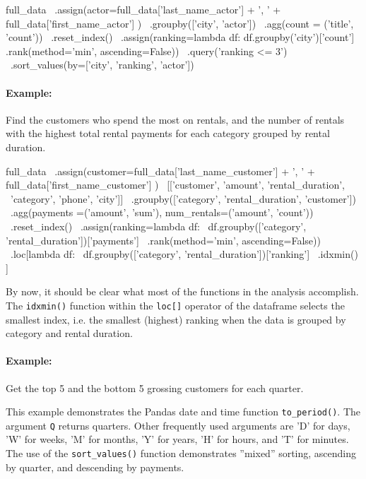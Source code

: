 \begin{samepage}
\begin{pythoncode}
full_data \
   .assign(actor=full_data['last_name_actor'] + ', ' + 
                 full_data['first_name_actor'] ) \
   .groupby(['city', 'actor']) \
   .agg(count = ('title', 'count')) \
   .reset_index() \
   .assign(ranking=lambda df: 
      df.groupby('city')['count']
        .rank(method='min', ascending=False)) \
   .query('ranking <= 3') \
   .sort_values(by=['city', 'ranking', 'actor'])
\end{pythoncode}
\end{samepage}

\paragraph*{Example:} Find the customers who spend the most on rentals, and the number of rentals with the highest total rental payments for each category grouped by rental duration.

\begin{samepage}
\begin{pythoncode}
full_data \
   .assign(customer=full_data['last_name_customer'] + ', ' + 
                    full_data['first_name_customer'] ) \
   [['customer', 'amount', 'rental_duration', \
     'category', 'phone', 'city']] \
   .groupby(['category', 'rental_duration', 'customer']) \
   .agg(payments =('amount', 'sum'), 
        num_rentals=('amount', 'count')) \
   .reset_index() \
   .assign(ranking=lambda df: \
      df.groupby(['category', 'rental_duration'])['payments'] \
        .rank(method='min', ascending=False)) \
    .loc[lambda df:  \
         df.groupby(['category', 'rental_duration'])['ranking'] \
           .idxmin() ]
\end{pythoncode}
\end{samepage}

By now, it should be clear what most of the functions in the analysis accomplish. The \texttt{idxmin()} function within the \texttt{loc[]} operator of the dataframe selects the smallest index, i.e. the smallest (highest) ranking when the data is grouped by category and rental duration.

\paragraph*{Example:} Get the top 5 and the bottom 5 grossing customers for each quarter.

This example demonstrates the Pandas date and time function \texttt{to\_period()}. The argument \texttt{Q} returns quarters. Other frequently used arguments are 'D' for days, 'W' for weeks, 'M' for months, 'Y' for years, 'H' for hours, and 'T' for minutes. The use of the \texttt{sort\_values()} function demonstrates ''mixed'' sorting, ascending by quarter, and descending by payments.

